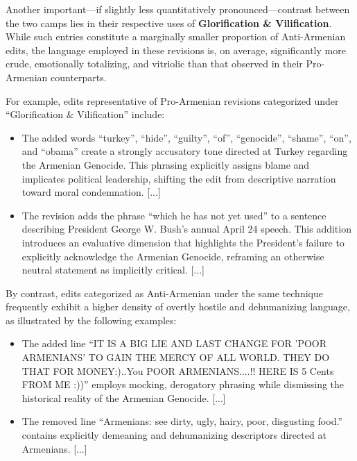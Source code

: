 \documentclass[11pt, a4paper, twoside, openright]{article} %
\begin{document}
Another important—if slightly less quantitatively pronounced—contrast between the two camps lies in their respective uses of \textbf{Glorification \& Vilification}. While such entries constitute a marginally smaller proportion of Anti-Armenian edits, the language employed in these revisions is, on average, significantly more crude, emotionally totalizing, and vitriolic than that observed in their Pro-Armenian counterparts.

For example, edits representative of Pro-Armenian revisions categorized under ``Glorification \& Vilification'' include:

\begin{itemize}
\item The added words ``turkey'', ``hide'', ``guilty'', ``of'', ``genocide'', ``shame'', ``on'', and ``obama'' create a strongly accusatory tone directed at Turkey regarding the Armenian Genocide. This phrasing explicitly assigns blame and implicates political leadership, shifting the edit from descriptive narration toward moral condemnation. [...]

\item The revision adds the phrase ``which he has not yet used'' to a sentence describing President George W. Bush’s annual April 24 speech. This addition introduces an evaluative dimension that highlights the President’s failure to explicitly acknowledge the Armenian Genocide, reframing an otherwise neutral statement as implicitly critical. [...]
\end{itemize}

By contrast, edits categorized as Anti-Armenian under the same technique frequently exhibit a higher density of overtly hostile and dehumanizing language, as illustrated by the following examples:

\begin{itemize}
\item The added line ``IT IS A BIG LIE AND LAST CHANGE FOR 'POOR ARMENIANS' TO GAIN THE MERCY OF ALL WORLD. THEY DO THAT FOR MONEY:)..You POOR ARMENIANS....!! HERE IS 5 Cents FROM ME :))'' employs mocking, derogatory phrasing while dismissing the historical reality of the Armenian Genocide. [...]

\item The removed line ``Armenians: see dirty, ugly, hairy, poor, disgusting food.'' contains explicitly demeaning and dehumanizing descriptors directed at Armenians. [...]
\end{itemize}
\end{document}
